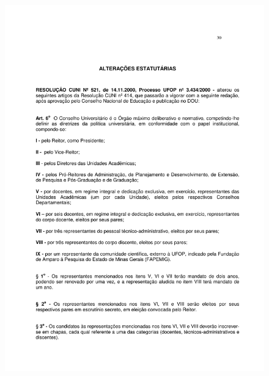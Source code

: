 \begin{figure}[p]
	\centering 
	\includegraphics[scale=0.7]{capitulos/resolucoes/cuni414/cuni414-30.pdf}
\end{figure}


